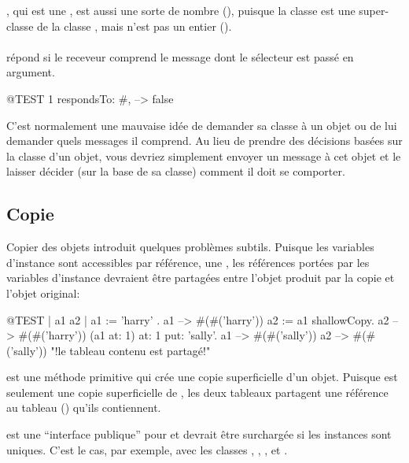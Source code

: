 \documentclass[a4paper,10pt,twoside]{book}
\begin{document}
, qui est une , est aussi une sorte de nombre (), puisque la classe  est une super-classe de la classe , mais  n'est pas un entier ().

\paragraph{}
 répond  si le receveur comprend le message dont le sélecteur est passé en argument.

\begin{code}{@TEST}
1 respondsTo: #, --> false
\end{code}

C'est normalement une mauvaise idée de demander sa classe à un
objet ou de lui demander quels messages il comprend.
Au lieu de prendre des décisions basées sur la classe d'un objet, 
vous devriez simplement envoyer un message à cet objet et le laisser 
décider (\ie sur la base de sa classe) comment il doit se comporter.

\subsection{Copie}

Copier des objets introduit quelques problèmes subtils. Puisque les variables 
d'instance sont accessibles par référence, une , 
les références portées par les variables d'instance devraient être partagées entre l'objet 
produit par la copie et l'objet original:

\begin{code}{@TEST | a1 a2 |}
a1 := { { 'harry' } }.
a1 --> #(#('harry'))
a2 := a1 shallowCopy.
a2 --> #(#('harry'))
(a1 at: 1) at: 1 put: 'sally'.
a1 --> #(#('sally'))
a2 --> #(#('sally'))    "!le tableau contenu est partagé!"
\end{code}

 est une méthode primitive qui crée une copie superficielle d'un objet. Puisque  est seulement une copie superficielle de , les deux tableaux partagent une référence au tableau () qu'ils contiennent.

 est une ``interface publique'' pour  et devrait être surchargée si les instances sont uniques. C'est le cas, par exemple, avec les classes , , ,  et .
\end{document}
